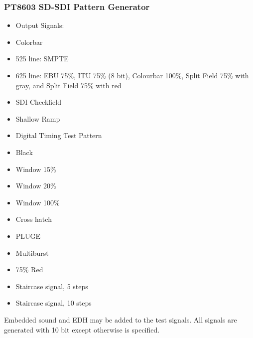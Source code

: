 \subsubsection{PT8603 SD-SDI Pattern Generator}

\begin{itemize}
	\setlength{\itemsep}{1pt}
	\setlength{\parskip}{0pt}

	\item Output Signals:
	\item[ ] Colorbar
	\item[ ] 525 line: SMPTE
	\item[ ] 625 line: EBU 75\%, ITU 75\% (8 bit), Colourbar 100\%, Split Field 75\% with gray, and Split Field 75\% with red
	\item SDI Checkfield
	\item Shallow Ramp
	\item Digital Timing Test Pattern
	\item Black
	\item Window 15\%
	\item Window 20\%
	\item Window 100\%
	\item Cross hatch
	\item PLUGE
	\item Multiburst
	\item 75\% Red
	\item Staircase signal, 5 steps
	\item Staircase signal, 10 steps
\end{itemize}

Embedded sound and EDH may be added to the test signals.
All signals are generated with 10 bit except otherwise is specified.